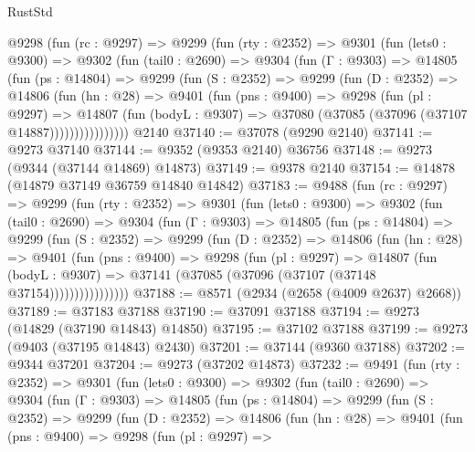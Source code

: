 \begin{lexlean}{RustStd}
\begin{coremodule}
    @9298
      (fun (rc : @9297) =>
      @9299
        (fun (rty : @2352) =>
        @9301
          (fun (lets0 : @9300) =>
          @9302
            (fun (tail0 : @2690) =>
            @9304
              (fun (Γ : @9303) =>
              @14805
                (fun (ps : @14804) =>
                @9299
                  (fun (S : @2352) =>
                  @9299
                    (fun (D : @2352) =>
                    @14806
                      (fun (hn : @28) =>
                      @9401
                        (fun (pns : @9400) =>
                        @9298
                          (fun (pl : @9297) =>
                          @14807
                            (fun (bodyL : @9307) =>
                            @37080 (@37085 (@37096 (@37107 @14887))))))))))))))))
    @2140
@37140 := @37078 (@9290 @2140)
@37141 := @9273 @37140
@37144 := @9352 (@9353 @2140) @36756
@37148 := @9273 (@9344 (@37144 @14869) @14873)
@37149 := @9378 @2140
@37154 := @14878 (@14879 @37149 @36759 @14840 @14842)
@37183 := @9488
    (fun (rc : @9297) =>
    @9299
      (fun (rty : @2352) =>
      @9301
        (fun (lets0 : @9300) =>
        @9302
          (fun (tail0 : @2690) =>
          @9304
            (fun (Γ : @9303) =>
            @14805
              (fun (ps : @14804) =>
              @9299
                (fun (S : @2352) =>
                @9299
                  (fun (D : @2352) =>
                  @14806
                    (fun (hn : @28) =>
                    @9401
                      (fun (pns : @9400) =>
                      @9298
                        (fun (pl : @9297) =>
                        @14807
                          (fun (bodyL : @9307) =>
                          @37141 (@37085 (@37096 (@37107 (@37148 @37154))))))))))))))))
@37188 := @8571 (@2934 (@2658 (@4009 @2637) @2668))
@37189 := @37183 @37188
@37190 := @37091 @37188
@37194 := @9273 (@14829 (@37190 @14843) @14850)
@37195 := @37102 @37188
@37199 := @9273 (@9403 (@37195 @14843) @2430)
@37201 := @37144 (@9360 @37188)
@37202 := @9344 @37201
@37204 := @9273 (@37202 @14873)
@37232 := @9491
    (fun (rty : @2352) =>
    @9301
      (fun (lets0 : @9300) =>
      @9302
        (fun (tail0 : @2690) =>
        @9304
          (fun (Γ : @9303) =>
          @14805
            (fun (ps : @14804) =>
            @9299
              (fun (S : @2352) =>
              @9299
                (fun (D : @2352) =>
                @14806
                  (fun (hn : @28) =>
                  @9401
                    (fun (pns : @9400) =>
                    @9298
                      (fun (pl : @9297) =>

\end{coremodule}
\end{lexlean}

